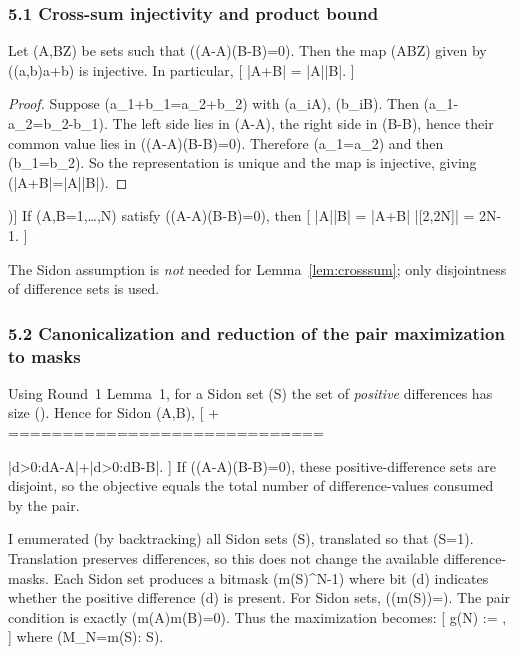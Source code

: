 \subsubsection{5.1 Cross-sum injectivity and product bound}
\begin{lemma}
	\label{lem:crosssum}
	Let (A,B\subset \mathbb Z) be sets such that ((A-A)\cap(B-B)={0}).
	Then the map (A\times B\to \mathbb Z) given by ((a,b)\mapsto a+b) is injective.  In particular,
	[
	|A+B| = |A||B|.
	]
\end{lemma}

\begin{proof}
	Suppose (a_1+b_1=a_2+b_2) with (a_i\in A), (b_i\in B).
	Then (a_1-a_2=b_2-b_1).
	The left side lies in (A-A), the right side in (B-B), hence their common value lies in ((A-A)\cap(B-B)={0}).
	Therefore (a_1=a_2) and then (b_1=b_2).
	So the representation is unique and the map is injective, giving (|A+B|=|A||B|).
\end{proof}

\begin{corollary}[Product bound in ([N])]
	\label{cor:product}
	If (A,B\subset [N]={1,\dots,N}) satisfy ((A-A)\cap(B-B)={0}), then
	[
	|A||B| = |A+B| \le |[2,2N]| = 2N-1.
	]
\end{corollary}

\begin{remark}
	The Sidon assumption is \emph{not} needed for Lemma~\ref{lem:crosssum}; only disjointness of difference sets is used.
\end{remark}

\subsubsection{5.2 Canonicalization and reduction of the pair maximization to masks}
Using Round~1 Lemma~1, for a Sidon set (S\subset [N]) the set of \emph{positive} differences has size ().
Hence for Sidon (A,B\subset [N]),
[
+
=============================

|{d>0:d\in A-A}|+|{d>0:d\in B-B}|.
]
If ((A-A)\cap(B-B)={0}), these positive-difference sets are disjoint, so the objective equals the total number of difference-values consumed by the pair.

I enumerated (by backtracking) all Sidon sets (S\subset [N]), translated so that (\min S=1).
Translation preserves differences, so this does not change the available difference-masks.
Each Sidon set produces a bitmask (m(S)^{N-1}) where bit (d) indicates whether the positive difference (d) is present.
For Sidon sets, ((m(S))=).
The pair condition is exactly (m(A)\wedge m(B)=0).
Thus the maximization becomes:
[
g(N) := ,
]
where (\mathcal M_N={m(S): S\subset [N]}).


